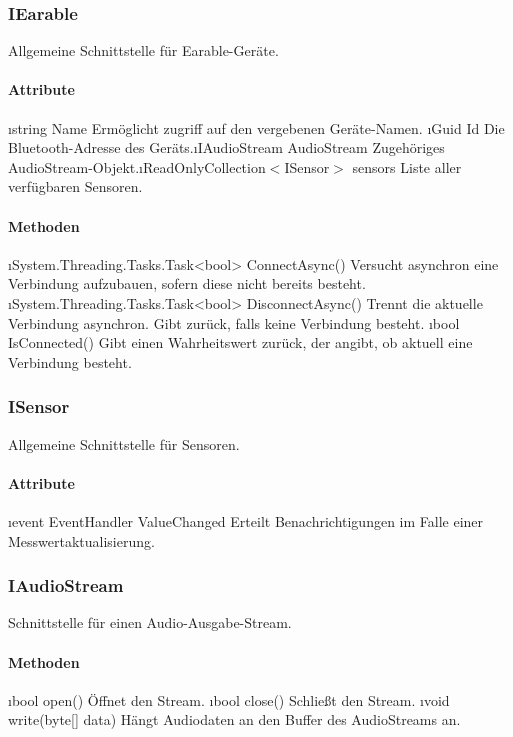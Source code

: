\documentclass[../entwurf.tex]{subfiles}
\begin{document}
\subsubsection{IEarable}
Allgemeine Schnittstelle für Earable-Geräte.
\paragraph{Attribute}
\begin{itemize}
	\i{string Name} Ermöglicht zugriff auf den vergebenen Geräte-Namen.
	\i{Guid Id} Die Bluetooth-Adresse des Geräts.\footnotemark[1]
	\i{IAudioStream AudioStream} Zugehöriges AudioStream-Objekt.\footnotemark[1]
	\i{ReadOnlyCollection$<$ISensor$>$ sensors} Liste aller verfügbaren Sensoren.\footnotemark[1]
\end{itemize}
\paragraph{Methoden}
\begin{itemize}
	\i{System.Threading.Tasks.Task<bool> ConnectAsync()} Versucht asynchron eine Verbindung aufzubauen, sofern diese nicht bereits besteht.
	\i{System.Threading.Tasks.Task<bool> DisconnectAsync()} Trennt die aktuelle Verbindung asynchron. Gibt  zurück, falls keine Verbindung besteht.
	\i{bool IsConnected()} Gibt einen Wahrheitswert zurück, der angibt, ob aktuell eine Verbindung besteht.
\end{itemize}

\subsubsection{ISensor}
Allgemeine Schnittstelle für Sensoren.
\paragraph{Attribute}
\begin{itemize}
	\i{event EventHandler ValueChanged} Erteilt Benachrichtigungen im Falle einer Messwertaktualisierung.\footnotemark[1]
\end{itemize}

\subsubsection{IAudioStream}
Schnittstelle für einen Audio-Ausgabe-Stream.
\paragraph{Methoden}
\begin{itemize}
	\i{bool open()} Öffnet den Stream.
	\i{bool close()} Schließt den Stream.
	\i{void write(byte[] data)} Hängt Audiodaten an den Buffer des AudioStreams an.
\end{itemize}

\end{document}

